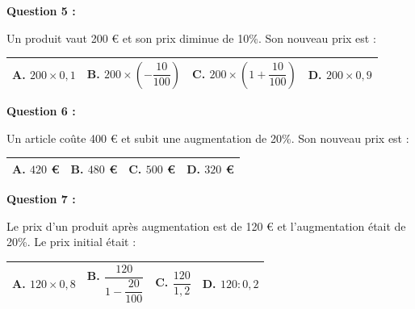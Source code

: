 \documentclass[12pt,a4paper]{article}
\begin{document}
\vspace{0.7cm}
\newpage

\textbf{Question 5 :} 
\vspace{5pt}

Un produit vaut 200 € et son prix diminue de 10\%.  
Son nouveau prix est : 
\vspace{0.3cm}

\renewcommand{\arraystretch}{3} 
\begin{tabular}{|m{3cm}|m{3.4cm}|m{3.8cm}|m{3.4cm}|}
\hline
\centering \vspace{-0.3cm} \textbf{A.} $200 \times 0,1$ & 
\centering \vspace{-0.3cm} \textbf{B.} $200 \times \left(-\dfrac{10}{100}\right)$ & 
\centering \vspace{-0.3cm} \textbf{C.} $200 \times \left(1+\dfrac{10}{100}\right)$ & 
\centering \vspace{-0.3cm} \textbf{D.} $200 \times 0,9$ \tabularnewline
\hline
\end{tabular}

\vspace{0.7cm}

\textbf{Question 6 :} 
\vspace{5pt}

Un article coûte 400 € et subit une augmentation de 20\%.  
Son nouveau prix est : 
\vspace{0.3cm}

\renewcommand{\arraystretch}{3} 
\begin{tabular}{|m{3.4cm}|m{3.4cm}|m{3.6cm}|m{3.4cm}|}
\hline
\centering \vspace{-0.3cm} \textbf{A.} $420$ € & 
\centering \vspace{-0.3cm} \textbf{B.} $480$ € & 
\centering \vspace{-0.3cm} \textbf{C.} $500$ € & 
\centering \vspace{-0.3cm} \textbf{D.} $320$ € \tabularnewline
\hline
\end{tabular}

\vspace{0.7cm}

\textbf{Question 7 :} 
\vspace{5pt}

Le prix d'un produit après augmentation est de 
120 € et l'augmentation était de 20\%.  
Le prix initial était : 
\vspace{0.3cm}

\renewcommand{\arraystretch}{4} 
\begin{tabular}{|m{3.4cm}|m{3.4cm}|m{3.4cm}|m{3.4cm}|}
\hline
\centering \vspace{-0.5cm} \textbf{A.} $120 \times 0,8$ & 
\centering \vspace{-0.9cm} \textbf{B.} $\dfrac{120}{1 - \dfrac{20}{100}}$ & 
\centering \vspace{-0.5cm} \textbf{C.} $\dfrac{120}{1,2}$ & 
\centering \vspace{-0.5cm} \textbf{D.} $120 : 0,2$ \tabularnewline
\hline
\end{tabular}
\end{document}
